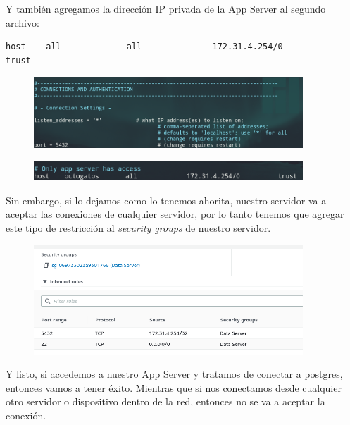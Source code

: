 \documentclass{article}
\begin{document}
Y también agregamos la dirección IP privada de la App
Server  al segundo archivo:
\begin{lstlisting}
host    all             all              172.31.4.254/0                       trust
\end{lstlisting}

\begin{figure}[H]
  \centering
  \includegraphics[width=0.9\textwidth]{DATASERVER/exhibitI}
  \label{fig:DATASERVER-I}
\end{figure}

\begin{figure}[H]
  \centering
  \includegraphics[width=0.9\textwidth]{DATASERVER/exhibitJ}
  \label{fig:DATASERVER-J}
\end{figure}

Sin embargo, si lo dejamos como lo tenemos ahorita, nuestro
servidor va a aceptar las conexiones de cualquier servidor,
por lo tanto tenemos que agregar este tipo de restricción
al \textit{security groups} de nuestro servidor.

\begin{figure}[H]
  \centering
  \includegraphics[width=0.9\textwidth]{DATASERVER/exhibitK}
  \label{fig:DATASERVER-K}
\end{figure}

Y listo, si accedemos a nuestro App Server y tratamos de
conectar a postgres, entonces vamos a tener éxito. Mientras
que si nos conectamos desde cualquier otro servidor o
dispositivo dentro de la red, entonces no se va a aceptar la
conexión.
\end{document}
